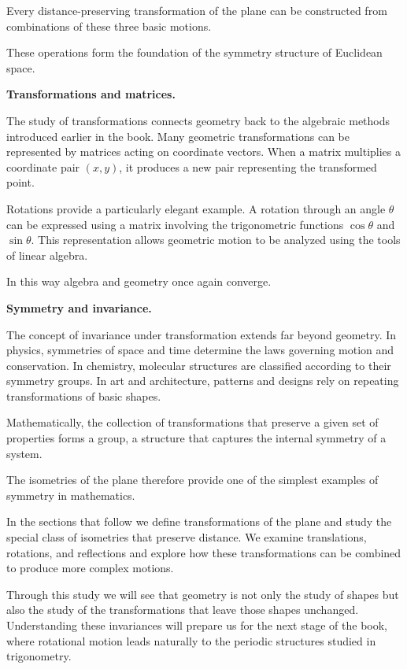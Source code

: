 \documentclass[11pt, openany]{book}
\theoremstyle{plain}
\theoremstyle{definition}
\theoremstyle{remark}
\begin{document}
Every distance-preserving transformation of the plane can be constructed
from combinations of these three basic motions.

These operations form the foundation of the symmetry structure of
Euclidean space.

\medskip

\textbf{Transformations and matrices.}

The study of transformations connects geometry back to the algebraic
methods introduced earlier in the book. Many geometric transformations
can be represented by matrices acting on coordinate vectors. When a
matrix multiplies a coordinate pair $(x,y)$, it produces a new pair
representing the transformed point.

Rotations provide a particularly elegant example. A rotation through an
angle $\theta$ can be expressed using a matrix involving the trigonometric
functions $\cos\theta$ and $\sin\theta$. This representation allows
geometric motion to be analyzed using the tools of linear algebra.

In this way algebra and geometry once again converge.

\medskip

\textbf{Symmetry and invariance.}

The concept of invariance under transformation extends far beyond
geometry. In physics, symmetries of space and time determine the laws
governing motion and conservation. In chemistry, molecular structures
are classified according to their symmetry groups. In art and
architecture, patterns and designs rely on repeating transformations of
basic shapes.

Mathematically, the collection of transformations that preserve a given
set of properties forms a group, a structure that captures the internal
symmetry of a system.

The isometries of the plane therefore provide one of the simplest
examples of symmetry in mathematics.

\medskip

In the sections that follow we define transformations of the plane and
study the special class of isometries that preserve distance. We examine
translations, rotations, and reflections and explore how these
transformations can be combined to produce more complex motions.

Through this study we will see that geometry is not only the study of
shapes but also the study of the transformations that leave those shapes
unchanged. Understanding these invariances will prepare us for the next
stage of the book, where rotational motion leads naturally to the
periodic structures studied in trigonometry.
\end{document}

